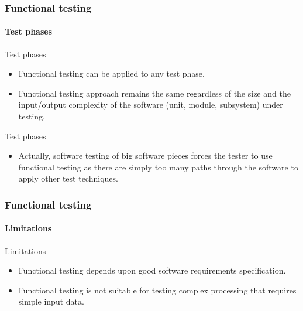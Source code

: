 \begin{frame}
\frametitle{Functional testing}
\framesubtitle{Test phases}

\begin{block:fact}{Test phases}
\begin{itemize}
	\item Functional testing can be applied to any test phase.

	\item Functional testing approach remains the same regardless of the size
	and the input/output complexity of the software (unit, module, subsystem)
	under testing.
\end{itemize}
\end{block:fact}


\begin{block:fact}{Test phases}
\begin{itemize}
	\item Actually, software testing of big software pieces forces the tester
	to use functional testing as there are simply too many paths through the
	software to apply other test techniques.
\end{itemize}
\end{block:fact}
\end{frame}


\begin{frame}
\frametitle{Functional testing}
\framesubtitle{Limitations}

\begin{block:fact}{Limitations}
\begin{itemize}
	\item Functional testing depends upon good software requirements
	specification.

	\item Functional testing is not suitable for testing complex processing
	that requires simple input data.
\end{itemize}
\end{block:fact}
\end{frame}



